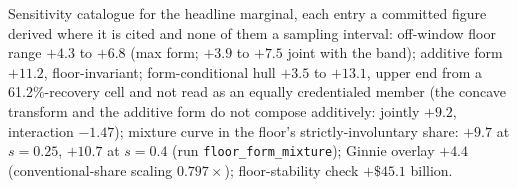 \documentclass[12pt]{article}
\begin{document}
\begin{table}[H]
\begin{threeparttable}
\begin{tablenotes}[flushleft]\footnotesize
\item[a] Sensitivity catalogue for the headline marginal, each entry a committed figure derived where it is cited and none of them a sampling interval: off-window floor range $+4.3$ to $+6.8$ (max form; $+3.9$ to $+7.5$ joint with the band); additive form $+11.2$, floor-invariant; form-conditional hull $+3.5$ to $+13.1$, upper end from a 61.2\%-recovery cell and not read as an equally credentialed member (the concave transform and the additive form do not compose additively: jointly $+9.2$, interaction $-1.47$); mixture curve in the floor's strictly-involuntary share: $+9.7$ at $s{=}0.25$, $+10.7$ at $s{=}0.4$ (run \texttt{floor\_form\_mixture}); Ginnie overlay $+4.4$ (conventional-share scaling $0.797\times$); floor-stability check $+\$45.1$ billion.
\end{tablenotes}
\end{threeparttable}
\end{table}
\end{document}
